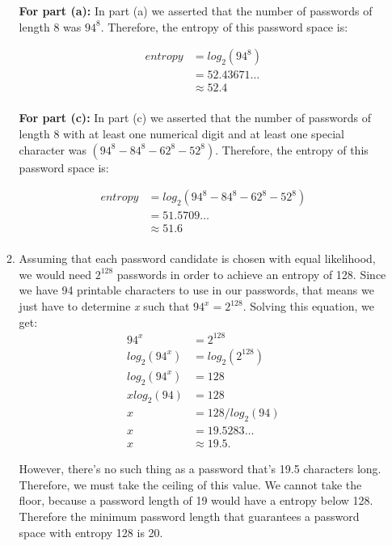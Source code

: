 \documentclass[11pt]{article}
\theoremstyle{definition}
\begin{document}
\begin{enumerate}
\begin{enumerate}
\textbf{For part (a):} In part (a) we asserted that the number of passwords of length 8 was $94^8$. Therefore, the entropy of this password space is:

\begin{align*}
entropy &= log_2(94^8)\\
&= 52.43671\ldots \\
&\approx 52.4\\
\end{align*}

\textbf{For part (c):} In part (c) we asserted that the number of passwords of length 8 with at least one numerical digit and at least one special character was $(94^8 - 84^8 - 62^8 - 52^8)$.
Therefore, the entropy of this password space is:

\begin{align*}
entropy &= log_2(94^8 - 84^8 - 62^8 - 52^8)\\
&= 51.5709\ldots \\
&\approx 51.6\\
\end{align*}

\item Assuming that each password candidate is chosen with equal likelihood, we would need $2^{128}$ passwords in order to achieve an entropy of 128. Since we have 94 printable
characters to use in our passwords, that means we just have to determine \textit{x} such that $94^x = 2^{128}$. Solving this equation, we get:\\

\begin{align*}
94^x &= 2^{128}\\
log_2(94^x) &= log_2(2^{128})\\
log_2(94^x) &= 128\\
x log_2(94) &= 128\\
x &= 128 / log_2(94)\\
x &=  19.5283 \ldots \\
x&\approx 19.5.
\end{align*}

However, there's no such thing as a password that's 19.5 characters long. Therefore, we must take the ceiling of this value. We cannot take the floor, because a password length
of 19 would have a entropy below 128. Therefore the minimum password length that guarantees a password space with entropy 128 is 20.

\end{enumerate}

\newpage


\end{enumerate}
\end{document}
